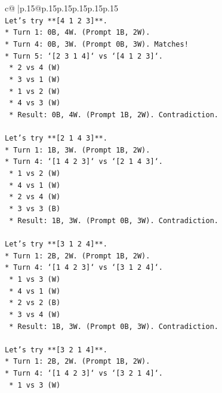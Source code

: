 \documentclass{article}
\begin{document}
{\begin{supertabular}{c@{$\;$}|p{.15\linewidth}@{}p{.15\linewidth}p{.15\linewidth}p{.15\linewidth}p{.15\linewidth}p{.15\linewidth}}
{{{\\ 
\texttt{Let's try **{[}4 1 2 3{]}**.} \\
\texttt{*   Turn 1: 0B, 4W. (Prompt 1B, 2W).} \\
\texttt{*   Turn 4: 0B, 3W. (Prompt 0B, 3W). Matches!} \\
\texttt{*   Turn 5: `{[}2 3 1 4{]}` vs `{[}4 1 2 3{]}`.} \\
\texttt{    *   2 vs 4 (W)} \\
\texttt{    *   3 vs 1 (W)} \\
\texttt{    *   1 vs 2 (W)} \\
\texttt{    *   4 vs 3 (W)} \\
\texttt{    *   Result: 0B, 4W. (Prompt 1B, 2W). Contradiction.} \\
\\ 
\texttt{Let's try **{[}2 1 4 3{]}**.} \\
\texttt{*   Turn 1: 1B, 3W. (Prompt 1B, 2W).} \\
\texttt{*   Turn 4: `{[}1 4 2 3{]}` vs `{[}2 1 4 3{]}`.} \\
\texttt{    *   1 vs 2 (W)} \\
\texttt{    *   4 vs 1 (W)} \\
\texttt{    *   2 vs 4 (W)} \\
\texttt{    *   3 vs 3 (B)} \\
\texttt{    *   Result: 1B, 3W. (Prompt 0B, 3W). Contradiction.} \\
\\ 
\texttt{Let's try **{[}3 1 2 4{]}**.} \\
\texttt{*   Turn 1: 2B, 2W. (Prompt 1B, 2W).} \\
\texttt{*   Turn 4: `{[}1 4 2 3{]}` vs `{[}3 1 2 4{]}`.} \\
\texttt{    *   1 vs 3 (W)} \\
\texttt{    *   4 vs 1 (W)} \\
\texttt{    *   2 vs 2 (B)} \\
\texttt{    *   3 vs 4 (W)} \\
\texttt{    *   Result: 1B, 3W. (Prompt 0B, 3W). Contradiction.} \\
\\ 
\texttt{Let's try **{[}3 2 1 4{]}**.} \\
\texttt{*   Turn 1: 2B, 2W. (Prompt 1B, 2W).} \\
\texttt{*   Turn 4: `{[}1 4 2 3{]}` vs `{[}3 2 1 4{]}`.} \\
\texttt{    *   1 vs 3 (W)} \\
}}}
\end{supertabular}}
\end{document}
